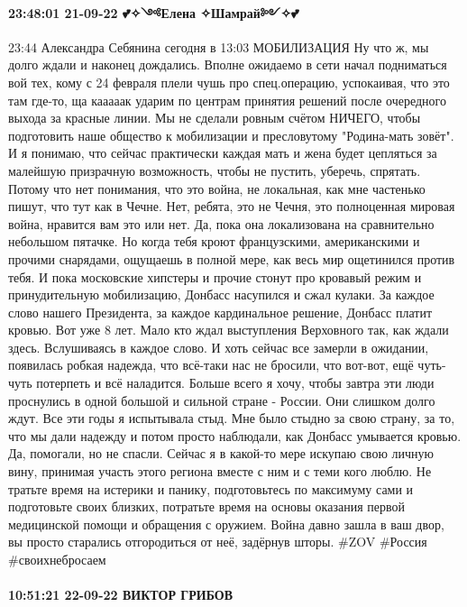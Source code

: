 \paragraph{23:48:01 21-09-22 💕✧༺Елена ✧Шамрай༻✧💕}
23:44
Александра Себянина
сегодня в 13:03
МОБИЛИЗАЦИЯ
Ну что ж, мы долго ждали и наконец дождались. Вполне ожидаемо в сети начал подниматься вой тех, кому с 24 февраля плели чушь про спец.операцию, успокаивая, что это там где-то, ща кааааак ударим по центрам принятия решений после очередного выхода за красные линии. Мы не сделали ровным счётом НИЧЕГО, чтобы подготовить наше общество к мобилизации и пресловутому "Родина-мать зовёт". И я понимаю, что сейчас практически каждая мать и жена будет цепляться за малейшую призрачную возможность, чтобы не пустить, уберечь, спрятать. Потому что нет понимания, что это война, не локальная, как мне частенько пишут, что тут как в Чечне. Нет, ребята, это не Чечня, это полноценная мировая война, нравится вам это или нет. Да, пока она локализована на сравнительно небольшом пятачке. Но когда тебя кроют французскими, американскими и прочими снарядами, ощущаешь в полной мере, как весь мир ощетинился против тебя.
И пока московские хипстеры и прочие стонут про кровавый режим и принудительную мобилизацию, Донбасс насупился и сжал кулаки. За каждое слово нашего Президента, за каждое кардинальное решение, Донбасс платит кровью. Вот уже 8 лет. Мало кто ждал выступления Верховного так, как ждали здесь. Вслушиваясь в каждое слово. И хоть сейчас все замерли в ожидании, появилась робкая надежда, что всё-таки нас не бросили, что вот-вот, ещё чуть-чуть потерпеть и всё наладится.
Больше всего я хочу, чтобы завтра эти люди проснулись в одной большой и сильной стране - России. Они слишком долго ждут. Все эти годы я испытывала стыд. Мне было стыдно за свою страну, за то, что мы дали надежду и потом просто наблюдали, как Донбасс умывается кровью. Да, помогали, но не спасли. Сейчас я в какой-то мере искупаю свою личную вину, принимая участь этого региона вместе с ним и с теми кого люблю.
Не тратьте время на истерики и панику, подготовьтесь по максимуму сами и подготовьте своих близких, потратьте время на основы оказания первой медицинской помощи и обращения с оружием. Война давно зашла в ваш двор, вы просто старались отгородиться от неё, задёрнув шторы.
#ZOV #Россия #своихнебросаем

\paragraph{10:51:21 22-09-22 ВИКТОР ГРИБОВ}


